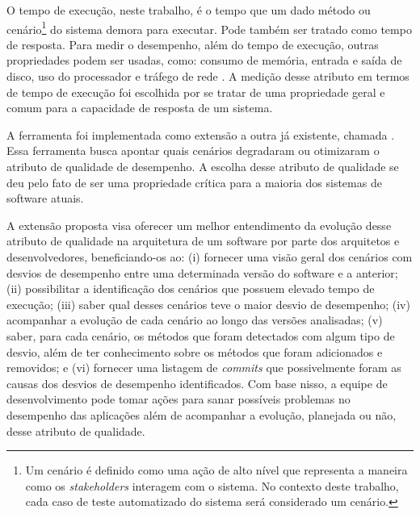 O tempo de execução, neste trabalho, é o tempo que um dado método ou cenário\footnote{Um cenário é definido como uma ação de alto nível que representa a maneira como os \textit{stakeholders} interagem com o sistema. No contexto deste trabalho, cada caso de teste automatizado do sistema será considerado um cenário.} do sistema demora para executar. Pode também ser tratado como tempo de resposta. Para medir o desempenho, além do tempo de execução, outras propriedades podem ser usadas, como: consumo de memória, entrada e saída de disco, uso do processador e tráfego de rede \cite{Malik2013}. A medição desse atributo em termos de tempo de execução foi escolhida por se tratar de uma propriedade geral e comum para a capacidade de resposta de um sistema.


A ferramenta foi implementada como extensão a outra já existente, chamada \textit{\perfMinerName} \cite{Pinto2015}. Essa ferramenta busca apontar quais cenários degradaram ou otimizaram o atributo de qualidade de desempenho. A escolha desse atributo de qualidade se deu pelo fato de ser uma propriedade crítica para a maioria dos sistemas de software atuais.

A extensão proposta visa oferecer um melhor entendimento da evolução desse atributo de qualidade na arquitetura de um software por parte dos arquitetos e desenvolvedores, beneficiando-os ao: (i) fornecer uma visão geral dos cenários com desvios de desempenho entre uma determinada versão do software e a anterior; (ii) possibilitar a identificação dos cenários que possuem elevado tempo de execução; (iii) saber qual desses cenários teve o maior desvio de desempenho; (iv) acompanhar a evolução de cada cenário ao longo das versões analisadas; (v) saber, para cada cenário, os métodos que foram detectados com algum tipo de desvio, além de ter conhecimento sobre os métodos que foram adicionados e removidos; e (vi) fornecer uma listagem de \textit{commits} que possivelmente foram as causas dos desvios de desempenho identificados. Com base nisso, a equipe de desenvolvimento pode tomar ações para sanar possíveis problemas no desempenho das aplicações além de acompanhar a evolução, planejada ou não, desse atributo de qualidade.

